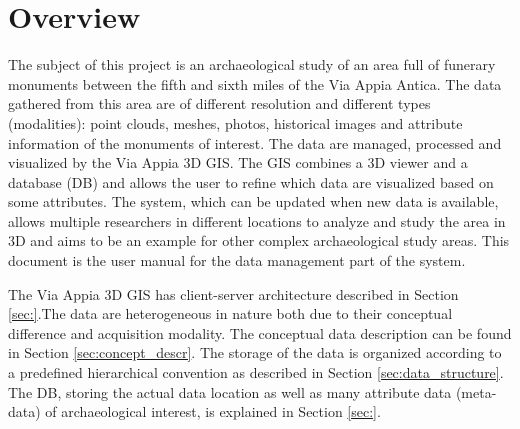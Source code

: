 \section{Overview}
\label{sec:dataman_overview}

 The subject of this project is an archaeological study of an area full of funerary monuments between the fifth and sixth miles of the Via Appia Antica. The data gathered from this area are of different resolution and different types (modalities): point clouds, meshes, photos, historical images and attribute information of the monuments of interest. The data are managed, processed and visualized by the Via Appia 3D GIS. The GIS combines a 3D viewer and a database (DB) and allows the user to refine which data are visualized based on some attributes. The system, which can be updated when new data is available, allows multiple researchers in different locations to analyze and study the area in 3D and aims to be an example for other complex archaeological study areas. This document is the user manual for the data management part of the system.

The Via Appia 3D GIS has client-server architecture described in Section \ref{sec:}.The data are heterogeneous in nature both due to their conceptual difference and acquisition modality. The conceptual data description can be found in Section \ref{sec:concept_descr}. The storage of the data is organized according to a predefined hierarchical convention as described in Section \ref{sec:data_structure}. The DB, storing the actual data location as well as many attribute data (meta-data) of archaeological interest, is explained in Section \ref{sec:}.   